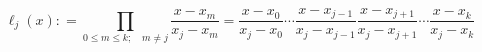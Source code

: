 \begin{equation}
	\ell_{j}(x): = \prod_{0 \leq m \leq k; \quad m \neq j}\frac{x - x_m}{x_j - x_m} = \frac {x - x_0}{x_j - x_0}\cdots \frac {x - x_{j - 1}}{x_j - x_{j - 1}}\frac {x - x_{j + 1}}{x_j - x_{j + 1}}\cdots \frac {x - x_k}{x_j - x_k}
\end{equation}
